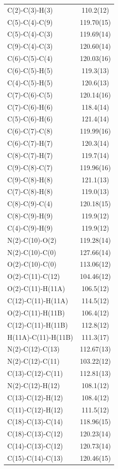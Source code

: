 \begin{center}
{\begin{supertabular}{p{1.5in}c}
C(2)-C(3)-H(3)&110.2(12)\\
C(5)-C(4)-C(9)&119.70(15)\\
C(5)-C(4)-C(3)&119.69(14)\\
C(9)-C(4)-C(3)&120.60(14)\\
C(6)-C(5)-C(4)&120.03(16)\\
C(6)-C(5)-H(5)&119.3(13)\\
C(4)-C(5)-H(5)&120.6(13)\\
C(7)-C(6)-C(5)&120.14(16)\\
C(7)-C(6)-H(6)&118.4(14)\\
C(5)-C(6)-H(6)&121.4(14)\\
C(6)-C(7)-C(8)&119.99(16)\\
C(6)-C(7)-H(7)&120.3(14)\\
C(8)-C(7)-H(7)&119.7(14)\\
C(9)-C(8)-C(7)&119.96(16)\\
C(9)-C(8)-H(8)&121.1(13)\\
C(7)-C(8)-H(8)&119.0(13)\\
C(8)-C(9)-C(4)&120.18(15)\\
C(8)-C(9)-H(9)&119.9(12)\\
C(4)-C(9)-H(9)&119.9(12)\\
N(2)-C(10)-O(2)&119.28(14)\\
N(2)-C(10)-C(0)&127.66(14)\\
O(2)-C(10)-C(0)&113.06(12)\\
O(2)-C(11)-C(12)&104.46(12)\\
O(2)-C(11)-H(11A)&106.5(12)\\
C(12)-C(11)-H(11A)&114.5(12)\\
O(2)-C(11)-H(11B)&106.4(12)\\
C(12)-C(11)-H(11B)&112.8(12)\\
H(11A)-C(11)-H(11B)&111.3(17)\\
N(2)-C(12)-C(13)&112.67(13)\\
N(2)-C(12)-C(11)&103.22(12)\\
C(13)-C(12)-C(11)&112.81(13)\\
N(2)-C(12)-H(12)&108.1(12)\\
C(13)-C(12)-H(12)&108.4(12)\\
C(11)-C(12)-H(12)&111.5(12)\\
C(18)-C(13)-C(14)&118.96(15)\\
C(18)-C(13)-C(12)&120.23(14)\\
C(14)-C(13)-C(12)&120.73(14)\\
C(15)-C(14)-C(13)&120.46(15)\\

\end{supertabular}}
\end{center}
